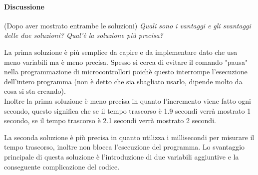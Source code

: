 \documentclass[../../docenti.tex]{subfiles}
\begin{document}
\paragraph{Discussione} (Dopo aver mostrato entrambe le soluzioni) \textit{Quali sono i vantaggi e gli svantaggi delle due soluzioni? Qual'è la soluzione più precisa?}

\vspace{1em}
La prima soluzione è più semplice da capire e da implementare dato che usa meno variabili ma è meno precisa.
Spesso si cerca di evitare il comando "pausa" nella programmazione di microcontrollori poichè questo interrompe l'esecuzione dell'intero programma (non è detto che sia sbagliato usarlo, dipende molto da cosa si sta creando).\\
Inoltre la prima soluzione è meno precisa in quanto l'incremento viene fatto ogni secondo, questo significa che se il tempo trascorso è 1.9 secondi verrà mostrato 1 secondo, se il tempo trascorso è 2.1 secondi verrà mostrato 2 secondi.

La seconda soluzione è più precisa in quanto utilizza i millisecondi per misurare il tempo trascorso, inoltre non blocca l'esecuzione del programma. Lo svantaggio principale di questa soluzione è l'introduzione di due variabili aggiuntive e la conseguente complicazione del codice.
\end{document}
